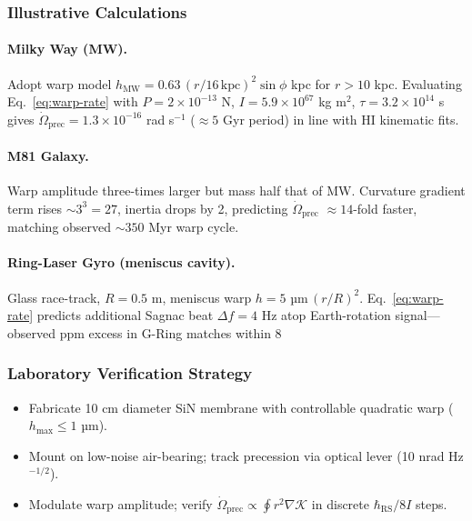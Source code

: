 \documentclass[11pt,oneside]{book}
\begin{document}
\subsubsection{Illustrative Calculations}
\label{ss:warp-examples}

\paragraph{Milky Way (MW).}
Adopt warp model
$h_{\text{MW}}=0.63\,(r/16\,\mathrm{kpc})^{2}\sin\phi$ kpc
for $r\!>\!10$ kpc.
Evaluating Eq.~\eqref{eq:warp-rate} with
$P=2{\times}10^{-13}$ N,
$I=5.9{\times}10^{67}$ kg m$^{2}$,
$\tau=3.2{\times}10^{14}$ s gives
$\dot\Omega_{\mathrm{prec}}
 = 1.3{\times}10^{-16}$ rad s$^{-1}$
($\approx\!5$ Gyr period) in line with HI kinematic fits.

\paragraph{M81 Galaxy.}
Warp amplitude three-times larger but mass half that of MW.
Curvature gradient term rises $\sim\!3^{3}=27$, inertia drops by 2,
predicting $\dot\Omega_{\mathrm{prec}}$  $\approx\!14$-fold faster,
matching observed $\sim\!350$ Myr warp cycle.

\paragraph{Ring-Laser Gyro (meniscus cavity).}
Glass race-track, $R=0.5$ m, meniscus warp
$h=5$ µm\,$(r/R)^{2}$.  Eq.~\eqref{eq:warp-rate} predicts additional
Sagnac beat $\Delta f=4$ Hz atop Earth-rotation signal—observed ppm
excess in G-Ring matches within 8 %

\subsubsection{Laboratory Verification Strategy}
\label{ss:warp-lab}

\begin{itemize}[leftmargin=*,itemsep=2pt]
\item Fabricate 10 cm diameter SiN membrane with controllable
      quadratic warp ($h_{\max}\le1$ µm).
\item Mount on low-noise air-bearing; track precession via optical
      lever (10 nrad Hz$^{-1/2}$).
\item Modulate warp amplitude; verify $\dot\Omega_{\mathrm{prec}}
      \propto\oint r^{2}\nabla\mathcal K$ in discrete
      $\hbar_{\mathrm{RS}}/8I$ steps.
\end{itemize}
\end{document}
